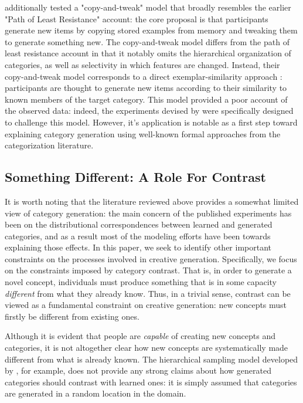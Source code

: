 \documentclass[12pt]{article}
\newcommand\nbcnote[1]{\todo[inline, backgroundcolor = yellow]{\textbf{NBC}: #1}}
\begin{document}
\begin{flushleft}
\nbcnote{Maybe we need a more technical view of the model here?}

\cite{jern2013probabilistic} additionally tested a "copy-and-tweak" model that broadly resembles the earlier "Path of Least Resistance" account: the core proposal is that participants generate new items by copying stored examples from memory and tweaking them to generate something new. The copy-and-tweak model differs from the path of least resistance account in that it notably omits the hierarchical organization of categories, as well as selectivity in which features are changed. Instead, their copy-and-tweak model corresponds to a direct exemplar-similarity approach \citep[e.g.,][]{nosofsky1984choice}: participants are thought to generate new items according to their similarity to known members of the target category. This model provided a poor account of the observed data: indeed, the experiments devised by \citeauthor{jern2013probabilistic} were specifically designed to challenge this model. However, it's application is notable as a first step toward explaining category generation using well-known formal approaches from the categorization literature.


\subsection{Something Different: A Role For Contrast}

It is worth noting that the literature reviewed above provides a somewhat limited view of category generation: the main concern of the published experiments has been on the distributional correspondences between learned and generated categories, and as a result most of the modeling efforts have been towards explaining those effects. In this paper, we seek to identify other important constraints on the processes involved in creative generation. Specifically, we focus on the constraints imposed by category contrast. That is, in order to generate a novel concept, individuals must produce something that is in some capacity \textit{different} from what they already know. Thus, in a trivial sense, contrast can be viewed as a fundamental constraint on creative generation: new concepts must firstly be different from existing ones. 

Although it is evident that people are \textit{capable} of creating new concepts and categories, it is not altogether clear how new concepts are systematically made different from what is already known. The hierarchical sampling model developed by \cite{jern2013probabilistic}, for example, does not provide any strong claims about how generated categories should contrast with learned ones: it is simply assumed that categories are generated in a random location in the domain. 







\end{flushleft}
\end{document}
